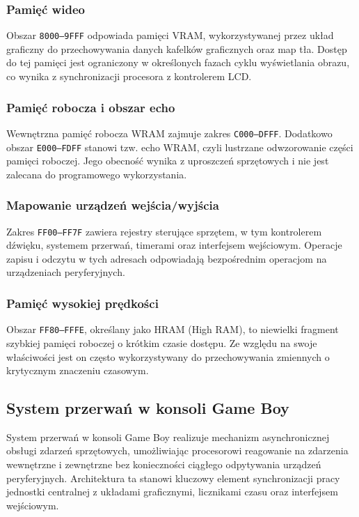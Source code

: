 \documentclass{article}
\begin{document}
\subsubsection{Pamięć wideo}

Obszar \texttt{8000--9FFF} odpowiada pamięci VRAM, wykorzystywanej przez układ graficzny do przechowywania danych kafelków graficznych oraz map tła. Dostęp do tej pamięci jest ograniczony w określonych fazach cyklu wyświetlania obrazu, co wynika z synchronizacji procesora z kontrolerem LCD.

\subsubsection{Pamięć robocza i obszar echo}

Wewnętrzna pamięć robocza WRAM zajmuje zakres \texttt{C000--DFFF}. Dodatkowo obszar \texttt{E000--FDFF} stanowi tzw. echo WRAM, czyli lustrzane odwzorowanie części pamięci roboczej. Jego obecność wynika z uproszczeń sprzętowych i nie jest zalecana do programowego wykorzystania.

\subsubsection{Mapowanie urządzeń wejścia/wyjścia}

Zakres \texttt{FF00--FF7F} zawiera rejestry sterujące sprzętem, w tym kontrolerem dźwięku, systemem przerwań, timerami oraz interfejsem wejściowym. Operacje zapisu i odczytu w tych adresach odpowiadają bezpośrednim operacjom na urządzeniach peryferyjnych.

\subsubsection{Pamięć wysokiej prędkości}

Obszar \texttt{FF80--FFFE}, określany jako HRAM (High RAM), to niewielki fragment szybkiej pamięci roboczej o krótkim czasie dostępu. Ze względu na swoje właściwości jest on często wykorzystywany do przechowywania zmiennych o krytycznym znaczeniu czasowym.

\subsection{System przerwań w konsoli Game Boy}

System przerwań w konsoli Game Boy realizuje mechanizm asynchronicznej obsługi zdarzeń sprzętowych, umożliwiając procesorowi reagowanie na zdarzenia wewnętrzne i zewnętrzne bez konieczności ciągłego odpytywania urządzeń peryferyjnych. Architektura ta stanowi kluczowy element synchronizacji pracy jednostki centralnej z układami graficznymi, licznikami czasu oraz interfejsem wejściowym.
\end{document}
